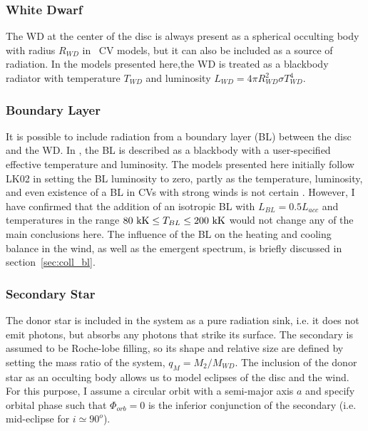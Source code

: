 \subsubsection{White Dwarf}

The WD at the center of the disc is always present as a spherical occulting
body with radius $R_{WD}$ in \py\ CV models, but it can also be included
as a source of radiation. In the models presented here,the
WD is treated as a blackbody radiator with temperature $T_{WD}$ and luminosity
$L_{WD} = 4\pi R_{WD}^2 \sigma T_{WD}^4$. 

\subsubsection{Boundary Layer}

It is possible to include radiation from a boundary layer (BL) between
the disc and the WD. In \py, the BL is described as
a blackbody with a user-specified effective temperature and
luminosity. The models presented here initially follow LK02 in setting
the BL luminosity to zero, partly as the temperature, luminosity, and even
existence of a BL in CVs with strong winds is not certain \citep{hoaredrew1993}.
However, I have confirmed that the addition 
of an isotropic BL with $L_{BL} = 0.5 L_{acc}$ and temperatures in 
the range $80~{\rm kK} \leq T_{BL} \leq 200~{\rm kK}$ would not change 
any of the main conclusions here. 
The influence of the BL on the heating and cooling balance
in the wind, as well as the emergent spectrum, is briefly discussed in
section~\ref{sec:coll_bl}.


\subsubsection{Secondary Star}

The donor star is included in the system as a pure radiation sink, 
i.e. it does not emit photons, but absorbs any photons that strike its
surface. The secondary is assumed to be Roche-lobe filling, so its
shape and relative size are defined by setting the mass ratio of the system, 
$q_M = M_2/M_{WD}$. The inclusion of the donor star as an occulting body
allows us to model eclipses of the disc and the wind. For this
purpose, I assume a circular orbit with a semi-major axis $a$ and 
specify orbital phase such that $\Phi_{orb} = 0$ is the
inferior conjunction of the secondary (i.e. mid-eclipse for $i \simeq
90^o$).




%
%


